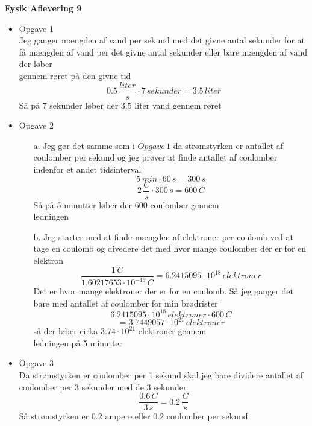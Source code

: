 \documentclass[12pt]{article}
\begin{document}
\Large{\textbf{Fysik Aflevering 9}}

\begin{itemize}
  \item {Opgave 1}\\
  Jeg ganger mængden af vand per sekund med det givne antal sekunder for at få mængden af vand per det givne antal sekunder eller bare mængden af vand der løber\\ gennem røret på den givne tid\\
  $$
  0.5\, \frac{liter}{s} \cdot 7\, sekunder = 3.5\, liter
  $$
  Så på 7 sekunder løber der $3.5$ liter vand gennem røret\\

  \item {Opgave 2}
  \begin{enumerate}
    \item[a.] Jeg gør det samme som i $Opgave\, 1$ da strømstyrken er antallet af coulomber per sekund og jeg prøver at finde antallet af coulomber indenfor et andet tidsinterval\\
    $$
    5\, min \cdot 60\, s = 300\, s
    $$
    $$
    2\, \frac{C}{s} \cdot 300\, s = 600\, C
    $$
    Så på 5 minutter løber der $600$ coulomber gennem\\ ledningen\\

    \item[b.] Jeg starter med at finde mængden af elektroner per coulomb ved at tage en coulomb og divedere det med hvor mange coulomber der er for en elektron\\
    $$
    \frac{1\, C}{1.60217653 \cdot 10^{-19}\, C} = 6.2415095 \cdot 10^{18}\, elektroner
    $$
    Det er hvor mange elektroner der er for en coulomb. Så jeg ganger det bare med antallet af coulomber for min brødrister\\
    $$
    6.2415095 \cdot 10^{18}\, elektroner \cdot 600\, C
    $$
    $$
    = 3.7449057 \cdot 10^{21}\, elektroner
    $$
    så der løber cirka $3.74 \cdot 10^{21}$ elektroner gennem\\ ledningen på 5 minutter\\
  \end{enumerate}

  \item{Opgave 3}\\
  Da strømstyrken er coulomber per 1 sekund skal jeg bare dividere antallet af coulomber per 3 sekunder med de 3 sekunder
  $$
  \frac{0.6\, C}{3\, s} = 0.2\, \frac{C}{s}
  $$
  Så strømstyrken er $0.2$ ampere eller $0.2$ coulomber per sekund\\


\end{itemize}
\end{document}
